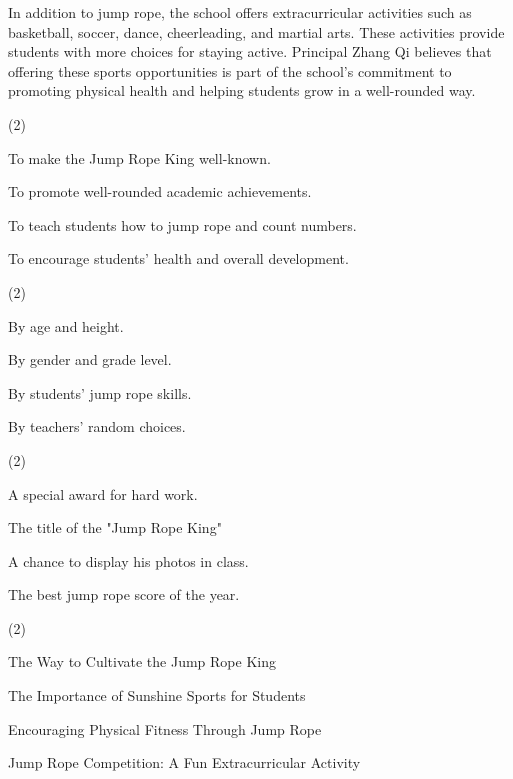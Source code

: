 \documentclass{英语试卷}
\begin{document}
\par In addition to jump rope, the school offers extracurricular activities such as basketball, soccer, dance, cheerleading, and martial arts. These activities provide students with more choices for staying active. Principal Zhang Qi believes that offering these sports opportunities is part of the school's commitment to promoting physical health and helping students grow in a well-rounded way.\par
{}
\begin{choices}(2)
  \item To make the Jump Rope King well-known.
  \item To promote well-rounded academic achievements.
  \item To teach students how to jump rope and count numbers.
  \item To encourage students' health and overall development.
\end{choices}
\begin{choices}(2)
  \item By age and height.
  \item By gender and grade level.
  \item By students' jump rope skills.
  \item By teachers' random choices.
\end{choices}
\begin{choices}(2)
  \item A special award for hard work.
  \item The title of the "Jump Rope King"
  \item A chance to display his photos in class.
  \item The best jump rope score of the year.
\end{choices}
\begin{choices}(2)
  \item The Way to Cultivate the Jump Rope King
  \item The Importance of Sunshine Sports for Students
  \item Encouraging Physical Fitness Through Jump Rope
  \item Jump Rope Competition: A Fun Extracurricular Activity
\end{choices}
\end{document}
